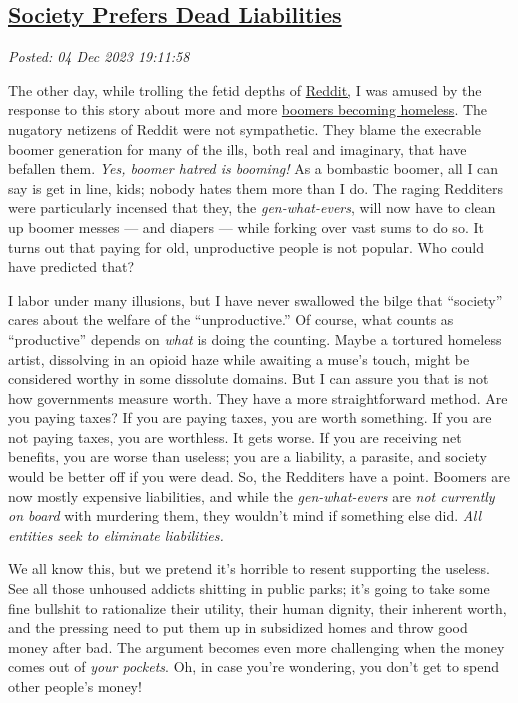 %

\subsection*{\href{http://analyzethedatanotthedrivel.org/2023/12/04/society-prefers-dead-liabilities/}{Society Prefers Dead Liabilities}}


\noindent\emph{Posted: 04 Dec 2023 19:11:58}
\vspace{6pt}

The other day, while trolling the fetid depths of
\href{https://www.reddit.com/}{Reddit,} I was amused by the response to
this story about more and more
\href{https://moneywise.com/news/economy/rate-of-homeless-baby-boomers-increasing}{boomers
becoming homeless}. The nugatory netizens of Reddit were not
sympathetic. They blame the execrable boomer generation for many of the
ills, both real and imaginary, that have befallen them. \emph{Yes,
boomer hatred is booming!} As a bombastic boomer, all I can say is get
in line, kids; nobody hates them more than I do. The raging Redditers
were particularly incensed that they, the \emph{gen-what-evers}, will
now have to clean up boomer messes --- and diapers --- while forking
over vast sums to do so. It turns out that paying for old, unproductive
people is not popular. Who could have predicted that?

I labor under many illusions, but I have never swallowed the bilge that
``society'' cares about the welfare of the ``unproductive.'' Of course,
what counts as ``productive'' depends on \emph{what} is doing the
counting. Maybe a tortured homeless artist, dissolving in an opioid haze
while awaiting a muse's touch, might be considered worthy in some
dissolute domains. But I can assure you that is not how governments
measure worth. They have a more straightforward method. Are you paying
taxes? If you are paying taxes, you are worth something. If you are not
paying taxes, you are worthless. It gets worse. If you are receiving net
benefits, you are worse than useless; you are a liability, a parasite,
and society would be better off if you were dead. So, the Redditers have
a point. Boomers are now mostly expensive liabilities, and while the
\emph{gen-what-evers} are \emph{not currently on board} with murdering
them, they wouldn't mind if something else did. \emph{All entities seek
to eliminate liabilities.}

We all know this, but we pretend it's horrible to resent supporting the
useless. See all those unhoused addicts shitting in public parks; it's
going to take some fine bullshit to rationalize their utility, their
human dignity, their inherent worth, and the pressing need to put them
up in subsidized homes and throw good money after bad. The argument
becomes even more challenging when the money comes out of \emph{your
pockets}. Oh, in case you're wondering, you don't get to spend other
people's money!

